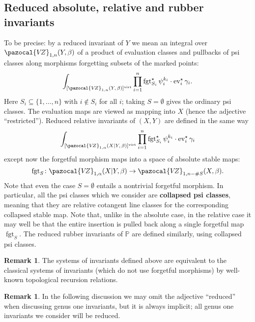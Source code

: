 \documentclass[11pt]{amsart}
\newcommand{\VZ}{\pazocal{V\!Z}}
\renewcommand{\to}{\rightarrow}
\newcommand{\virt}[1]{[#1]^{\operatorname{virt}}}
\newcommand{\ev}{\operatorname{ev}}
\newcommand{\fgt}{\operatorname{fgt}}
\theoremstyle{definition}
\theoremstyle{definition}
\newtheorem{remark}[thm]{Remark}
\begin{document}
\subsection{Reduced absolute, relative and rubber invariants} To be precise: by a reduced invariant of $Y$ we mean an integral over $\VZ_{1,n}(Y,\beta)$ of a product of evaluation classes and pullbacks of psi classes along morphisms forgetting subsets of the marked points:
\begin{equation*} \int_{\virt{\VZ_{1,n}(Y,\, \beta)}} \prod_{i=1}^n \fgt_{S_i}^\star \psi_i^{k_i} \cdot \ev_i^\star \gamma_i.\end{equation*}
Here $S_i \subseteq \{1,\ldots,n\}$ with $i \not\in S_i$ for all $i$; taking $S=\emptyset$ gives the ordinary  psi classes. The evaluation maps are viewed as mapping into $X$ (hence the adjective ``restricted''). Reduced relative invariants of $(X,Y)$ are defined in the same way
\begin{equation*} \int_{\virt{\VZ_{1,\alpha}(X|Y,\, \beta)}} \prod_{i=1}^n \fgt_{S_i}^\star \psi_i^{k_i} \cdot \ev_i^\star \gamma_i\end{equation*}
except now the forgetful morphism maps into a space of absolute stable maps:
\begin{equation*} \fgt_S \colon \VZ_{1,\alpha}(X|Y,\beta) \to \VZ_{1,n-\#S}(X,\beta).\end{equation*}
Note that even the case $S=\emptyset$ entails a nontrivial forgetful morphism. In particular, all the psi classes which we consider are \textbf{collapsed psi classes}, meaning that they are relative cotangent line classes for the corresponding collapsed stable map. Note that, unlike in the absolute case, in the relative case it may well be that the entire insertion is pulled back along a single forgetful map $\fgt_S$. The reduced rubber invariants of $\mathbb{P}$ are defined similarly, using collapsed psi classes.

\begin{remark}The systems of invariants defined above are equivalent to the classical systems of invariants (which do not use forgetful morphisms) by well-known topological recursion relations.\end{remark}

\begin{remark} In the following discussion we may omit the adjective ``reduced'' when discussing genus one invariants, but it is always implicit; all genus one invariants we consider will be reduced.\end{remark}
\end{document}
